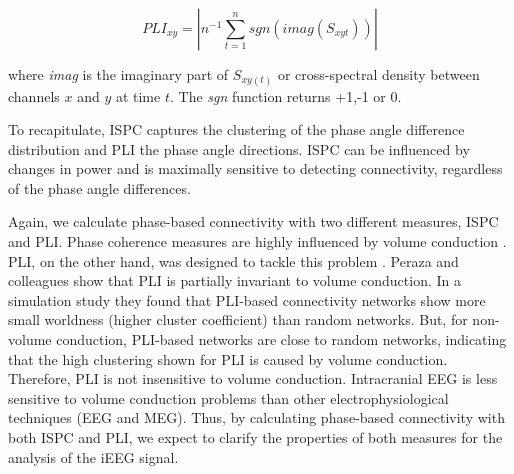 \documentclass[11pt, onecolumn]{article}
\begin{document}
{\begin{equation}
PLI_{xy} = |n^{-1} \sum_{t=1}^{n}sgn(imag(S_{xyt}))|
\label{eq:pli}
\end{equation}

where \textit{imag} is the imaginary part of $S_{xy(t)}$ or cross-spectral density between channels $x$ and $y$ at time $t$.
The \textit{sgn} function returns +1,-1 or 0. %

To recapitulate, ISPC captures the clustering of the phase angle difference distribution and PLI the phase angle directions. ISPC can be influenced by changes in power and is maximally sensitive to detecting connectivity, regardless of the phase angle differences. 

Again, we calculate phase-based connectivity with two different measures, ISPC and PLI. Phase coherence measures are highly influenced by volume conduction  \citep{mormann2000mean}. %
PLI, on the other hand, was designed to tackle this problem \cite{stam2007phase}. Peraza and colleagues \citep{peraza2012volume} show that PLI is partially invariant to volume conduction. In a simulation study they found that PLI-based connectivity networks show more small worldness (higher cluster coefficient) than random networks. But, for non-volume conduction, PLI-based networks are close to random networks, indicating that the high clustering shown for PLI is caused by volume conduction. Therefore, PLI is not insensitive to volume conduction. Intracranial EEG is less sensitive to volume conduction problems than other electrophysiological techniques (EEG and MEG). Thus, by calculating phase-based connectivity with both ISPC and PLI, we expect to clarify the properties of both measures for the analysis of the iEEG signal.


}
\end{document}
